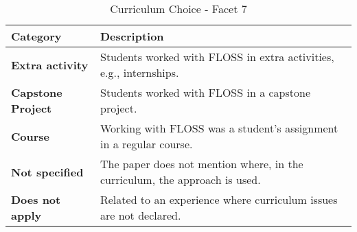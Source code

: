 \begin{table}[h]
	\centering
	\caption {Curriculum Choice - Facet 7}
        \begin{small}
            \vspace{-0.25cm}
		{\begin{tabular}{l|p{2.2in}}
			\bf Category & \bf Description \\
			\hline
			\bf Extra activity & Students worked with FLOSS in extra activities, e.g., internships. \\
			\bf Capstone Project & Students worked with FLOSS in a capstone project. \\
			\bf Course & Working with FLOSS was a student's assignment in a regular course. \\
			\bf Not specified & The paper does not mention where, in the curriculum, the approach is used. \\
			\bf Does not apply & Related to an experience where curriculum issues are not declared. \\
		\end{tabular}} \label{tab:curriculumApproach}
        \end{small}
\end{table}
